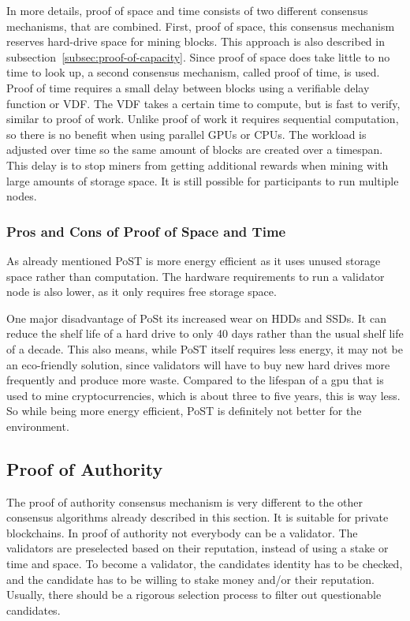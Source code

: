 In more details, proof of space and time consists of two different consensus mechanisms, that are combined.
First, proof of space, this consensus mechanism reserves hard-drive space for mining blocks.
This approach is also described in subsection\ \ref{subsec:proof-of-capacity}.
Since proof of space does take little to no time to look up, a second consensus mechanism, called proof of time, is used.
Proof of time requires a small delay between blocks using a verifiable delay function or VDF\@.
The VDF takes a certain time to compute, but is fast to verify, similar to proof of work.
Unlike proof of work it requires sequential computation, so there is no benefit when using parallel GPUs or CPUs.
The workload is adjusted over time so the same amount of blocks are created over a timespan.
This delay is to stop miners from getting additional rewards when mining with large amounts of storage space.
It is still possible for participants to run multiple nodes.\cite{supraoracles-post,chia-whitepaper}

\subsubsection{Pros and Cons of Proof of Space and Time}
As already mentioned PoST is more energy efficient as it uses unused storage space rather than computation.
The hardware requirements to run a validator node is also lower, as it only requires free storage space.

One major disadvantage of PoSt its increased wear on HDDs and SSDs.
It can reduce the shelf life of a hard drive to only 40 days rather than the usual shelf life of a decade.
This also means, while PoST itself requires less energy, it may not be an eco-friendly solution, since validators will have to buy new hard drives more frequently and produce more waste.
Compared to the lifespan of a gpu that is used to mine cryptocurrencies, which is about three to five years, this is way less.
So while being more energy efficient, PoST is definitely not better for the environment.\cite{euronews-chia, devicetest-gpu-lifespan, supraoracles-post}

\subsection{Proof of Authority}\label{subsec:proof-of-authority}
The proof of authority consensus mechanism is very different to the other consensus algorithms already described in this section.
It is suitable for private blockchains.
In proof of authority not everybody can be a validator.
The validators are preselected based on their reputation, instead of using a stake or time and space.
To become a validator, the candidates identity has to be checked, and the candidate has to be willing to stake money and/or their reputation.
Usually, there should be a rigorous selection process to filter out questionable candidates.\cite{coindesk-poa}


